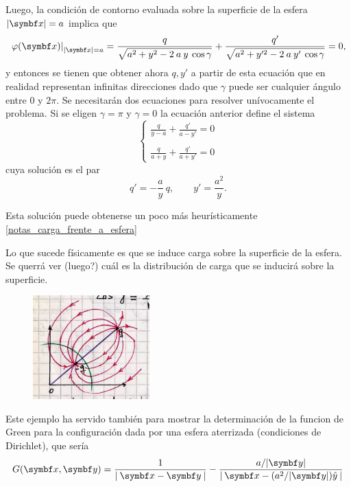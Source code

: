 \documentclass[10pt,oneside]{CBFT_book}
\begin{document}
Luego, la condición de contorno evaluada sobre la superficie de la esfera $|\vb{x}| = a$ implica que 
\[
	\left. \vp(\vbx)\right|_{|\vb{x}| = a} = 
	\frac{q}{\sqrt{ a^2 + y^2 - 2 \: a \: y \:\cos{\gamma}} } +
	\frac{q'}{\sqrt{ a^2 + y'^2 - 2 \: a \: y' \: \cos{\gamma} }} = 0,
\]
y entonces se tienen que obtener ahora $q, y'$ a partir de esta ecuación que en realidad representan
infinitas direcciones dado que $ \gamma $ puede ser cualquier ángulo entre $0$ y $2\pi$.
Se necesitarán dos ecuaciones para resolver unívocamente el problema.
Si se eligen $\gamma = \pi$ y $\gamma = 0$ la ecuación anterior define el sistema
\[
	\begin{cases}
		\displaystyle \frac{q}{y-a} + \frac{q'}{a-y'} = 0 \\
		\\
		\displaystyle  \frac{q}{a+y} + \frac{q'}{a+y'} = 0 
	\end{cases}
\]
cuya solución es el par
\[
	q' = - \frac{a}{y} \: q, \qquad y' = \frac{a^2}{y}.
\]

Esta solución puede obtenerse un poco más heurísticamente \ref{notas_carga_frente_a_esfera}

Lo que sucede físicamente es que se induce carga sobre la superficie de la esfera.
Se querrá ver (luego?) cuál es la distribución de carga que se inducirá sobre la superficie.


\begin{figure}[htb]
	\begin{center}
	\includegraphics[width=0.4\textwidth]{images/fig_ft1_carga_induciendo_en_esfera.jpg}	 
	\end{center}
	\caption{}
\end{figure}

Este ejemplo ha servido también para mostrar la determinación de la funcion de Green para la configuración
dada por una esfera aterrizada (condiciones de Dirichlet), que sería
\[
	G(\vbx,\vb{y}) = \frac{1}{| \: \vbx - \vb{y} \:|} - \frac{a/|\vb{y}|}{| \:\vbx - ( a^2 / |\vb{y}| ) \hat{y} \: |} 
\]
\end{document}
